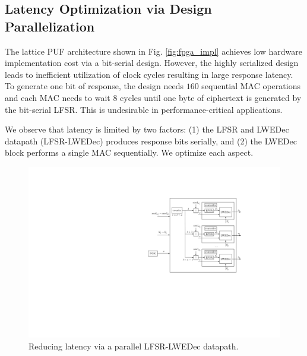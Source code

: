 \subsection{Latency Optimization via Design Parallelization}
\label{sec: lpuf_par}



The lattice PUF architecture shown in Fig. \ref{fig:fpga_impl} achieves low hardware implementation cost via a bit-serial design. %
However, the highly serialized design leads to inefficient utilization of clock cycles resulting in large response latency. To generate one bit of response, the design needs $160$ sequential MAC operations and each MAC needs to wait $8$ cycles until one byte of ciphertext is generated by the bit-serial LFSR. This is undesirable in performance-critical applications. %


We observe that latency is limited by two factors: (1) the LFSR and LWEDec datapath (LFSR-LWEDec) produces response bits serially, and (2) the LWEDec block performs a single MAC sequentially.  
We optimize each aspect.

\begin{figure}[t!]
\centering
\includegraphics[width = 0.8\linewidth]{./figs/lpuf_p1}
\caption{Reducing latency via a parallel LFSR-LWEDec datapath.}
\label{fig:lpuf_p1}
\end{figure}


